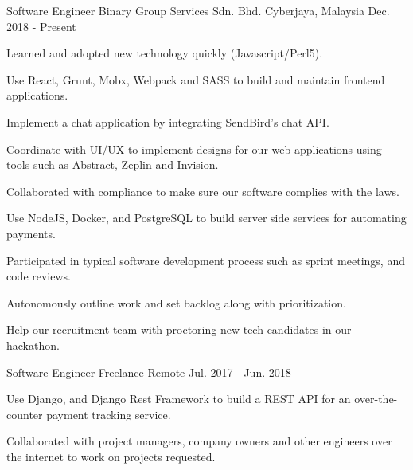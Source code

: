 

\begin{cventries}

  \cventry
    {Software Engineer} %
    {Binary Group Services Sdn. Bhd.} %
    {Cyberjaya, Malaysia} %
    {Dec. 2018 - Present} %
    {
      \begin{cvitems} %
        \item {Learned and adopted new technology quickly (Javascript/Perl5).}
        \item {Use React, Grunt, Mobx, Webpack and SASS to build and maintain frontend applications.}
        \item {Implement a chat application by integrating SendBird's chat API.}
        \item {Coordinate with UI/UX to implement designs for our web applications using tools such as Abstract, Zeplin and Invision.}
        \item {Collaborated with compliance to make sure our software complies with the laws.}
        \item {Use NodeJS, Docker, and PostgreSQL to build server side services for automating payments.}
        \item {Participated in typical software development process such as sprint meetings, and code reviews.}
        \item {Autonomously outline work and set backlog along with prioritization.}
        \item {Help our recruitment team with proctoring new tech candidates in our hackathon.}
      \end{cvitems}
    }

  \cventry
    {Software Engineer} %
    {Freelance} %
    {Remote} %
    {Jul. 2017 - Jun. 2018} %
    {
      \begin{cvitems} %
        \item {Use Django, and Django Rest Framework to build a REST API for an over-the-counter payment tracking service.}
        \item {Collaborated with project managers, company owners and other engineers over the internet to work on projects requested.}
      \end{cvitems}
    }
\end{cventries}
